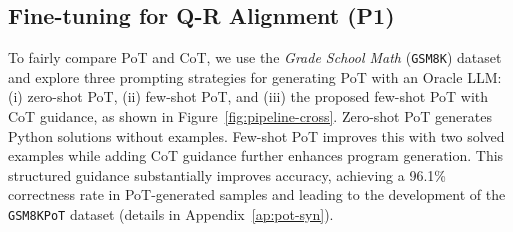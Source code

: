 %
% 









\subsection{Fine-tuning for Q-R Alignment (P1)}

% 
To fairly compare PoT and CoT, we use the \emph{Grade School Math} (\texttt{GSM8K}) dataset \cite{cobbe2021gsm8k} and explore three prompting strategies for generating PoT with an Oracle LLM: (i) zero-shot PoT, (ii) few-shot PoT, and (iii) the proposed few-shot PoT with CoT guidance, 
as shown in Figure~\ref{fig:pipeline-cross}.
%
Zero-shot PoT generates Python solutions without examples. Few-shot PoT improves this with two solved examples while adding CoT guidance further enhances program generation.
%
This structured guidance substantially improves accuracy, achieving a 96.1\% correctness rate in PoT-generated samples and leading to the development of the \texttt{GSM8KPoT} dataset (details in Appendix~\ref{ap:pot-syn}).



